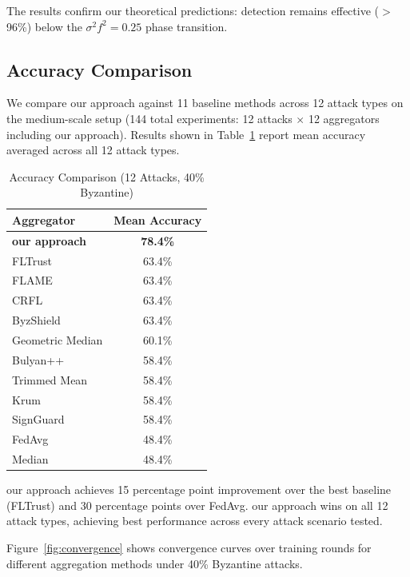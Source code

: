\documentclass[runningheads]{llncs}
\begin{document}
The results confirm our theoretical predictions: detection remains effective ($>$96\%) below the $\sigma^2 f^2 = 0.25$ phase transition.

\subsection{Accuracy Comparison}

We compare our approach against 11 baseline methods across 12 attack types on the medium-scale setup (144 total experiments: 12 attacks $\times$ 12 aggregators including our approach). Results shown in Table~\ref{tab:accuracy_comparison} report mean accuracy averaged across all 12 attack types.

\begin{table}[htbp]
\centering
\caption{Accuracy Comparison (12 Attacks, 40\% Byzantine)}
\label{tab:accuracy_comparison}
\begin{tabular}{|l|c|}
\hline
\textbf{Aggregator} & \textbf{Mean Accuracy} \\
\hline
\textbf{our approach} & \textbf{78.4\%} \\
FLTrust & 63.4\% \\
FLAME & 63.4\% \\
CRFL & 63.4\% \\
ByzShield & 63.4\% \\
Geometric Median & 60.1\% \\
Bulyan++ & 58.4\% \\
Trimmed Mean & 58.4\% \\
Krum & 58.4\% \\
SignGuard & 58.4\% \\
FedAvg & 48.4\% \\
Median & 48.4\% \\
\hline
\end{tabular}
\end{table}

our approach achieves 15 percentage point improvement over the best baseline (FLTrust) and 30 percentage points over FedAvg. our approach wins on all 12 attack types, achieving best performance across every attack scenario tested.

Figure~\ref{fig:convergence} shows convergence curves over training rounds for different aggregation methods under 40\% Byzantine attacks.
\end{document}
